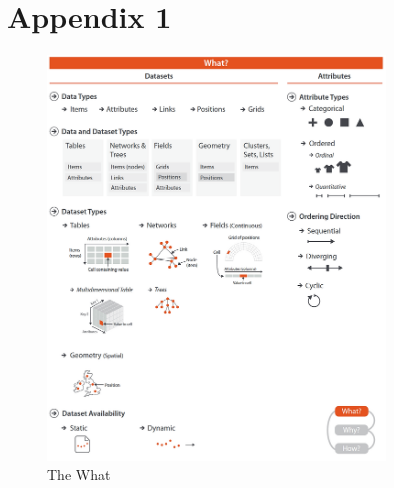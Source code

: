 \section{Appendix 1} \label{app:www-what}

\begin{figure}[h]
  \centering
  \includegraphics[width=0.8\textwidth]{Images/www/what.png}
  \caption{The What}
  \label{fig:www-what}
\end{figure}

\newpage